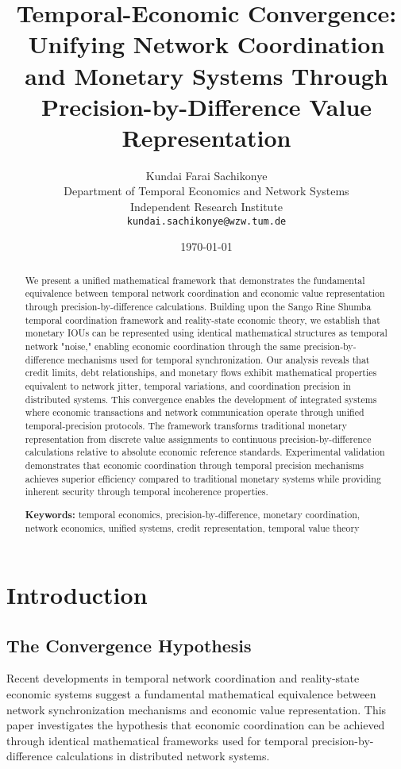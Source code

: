 \documentclass[12pt,a4paper]{article}
\title{Temporal-Economic Convergence: Unifying Network Coordination and Monetary Systems Through Precision-by-Difference Value Representation}
\author{Kundai Farai Sachikonye\\
Department of Temporal Economics and Network Systems\\
Independent Research Institute\\
\texttt{kundai.sachikonye@wzw.tum.de}}
\date{\today}
\begin{document}
\maketitle

\begin{abstract}
We present a unified mathematical framework that demonstrates the fundamental equivalence between temporal network coordination and economic value representation through precision-by-difference calculations. Building upon the Sango Rine Shumba temporal coordination framework and reality-state economic theory, we establish that monetary IOUs can be represented using identical mathematical structures as temporal network "noise," enabling economic coordination through the same precision-by-difference mechanisms used for temporal synchronization. Our analysis reveals that credit limits, debt relationships, and monetary flows exhibit mathematical properties equivalent to network jitter, temporal variations, and coordination precision in distributed systems. This convergence enables the development of integrated systems where economic transactions and network communication operate through unified temporal-precision protocols. The framework transforms traditional monetary representation from discrete value assignments to continuous precision-by-difference calculations relative to absolute economic reference standards. Experimental validation demonstrates that economic coordination through temporal precision mechanisms achieves superior efficiency compared to traditional monetary systems while providing inherent security through temporal incoherence properties.

\textbf{Keywords:} temporal economics, precision-by-difference, monetary coordination, network economics, unified systems, credit representation, temporal value theory
\end{abstract}

\section{Introduction}

\subsection{The Convergence Hypothesis}

Recent developments in temporal network coordination \citep{sachikonye2025sango} and reality-state economic systems \citep{sachikonye2025reality} suggest a fundamental mathematical equivalence between network synchronization mechanisms and economic value representation. This paper investigates the hypothesis that economic coordination can be achieved through identical mathematical frameworks used for temporal precision-by-difference calculations in distributed network systems.
\end{document}
